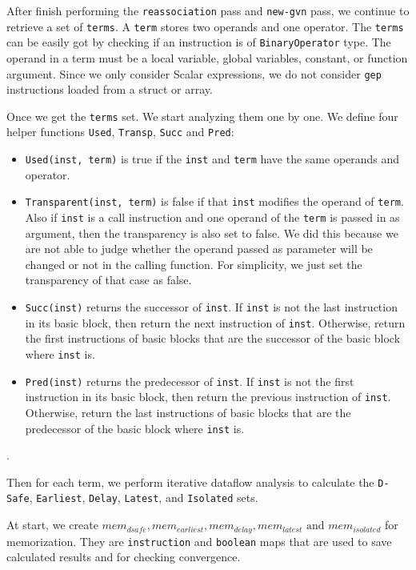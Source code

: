 \documentclass[onecolumn,10pt]{journal}
\begin{document}
After finish performing the \texttt{reassociation} pass and \texttt{new-gvn} pass, we continue to retrieve a set of \texttt{terms}. A \texttt{term} stores two operands and one operator. The \texttt{terms} can be easily got by checking if an instruction is of \texttt{BinaryOperator} type. The operand in a term must be a local variable, global variables, constant, or function argument. Since we only consider Scalar expressions, we do not consider \texttt{gep} instructions loaded from a struct or array. 

Once we get the \texttt{terms} set. We start analyzing them one by one. We define four helper functions \texttt{Used}, \texttt{Transp}, \texttt{Succ} and \texttt{Pred}:
\begin{itemize}
\item \texttt{Used(inst, term)} is true if the \texttt{inst} and \texttt{term} have the same operands and operator.
\item  \texttt{Transparent(inst, term)} is false if that \texttt{inst} modifies the operand of \texttt{term}. Also if \texttt{inst} is a call instruction and one operand of the \texttt{term} is passed in as argument, then the transparency is also set to false. We did this because we are not able to judge whether the operand passed as parameter will be changed or not in the calling function. For simplicity, we just set the transparency of that case as false.
\item \texttt{Succ(inst)} returns the successor of \texttt{inst}. If \texttt{inst} is not the last instruction in its basic block, then return the next instruction of \texttt{inst}. Otherwise, return the first instructions of basic blocks that are the successor of the basic block where \texttt{inst} is.   
\item \texttt{Pred(inst)} returns the predecessor of \texttt{inst}. If \texttt{inst} is not the first instruction in its basic block, then return the previous instruction of \texttt{inst}. Otherwise, return the last instructions of basic blocks that are the predecessor of the basic block where \texttt{inst} is.
\end{itemize}.

Then for each term, we perform iterative dataflow analysis to calculate the \texttt{D-Safe}, \texttt{Earliest}, \texttt{Delay}, \texttt{Latest}, and \texttt{Isolated} sets. 

At start, we create $mem_{dsafe}, mem_{earliest}, mem_{delay}, mem_{latest}\text{ and } mem_{isolated}$ for memorization. They are \texttt{instruction} and \texttt{boolean} maps that are used to save calculated results and for checking convergence.  
\end{document}
